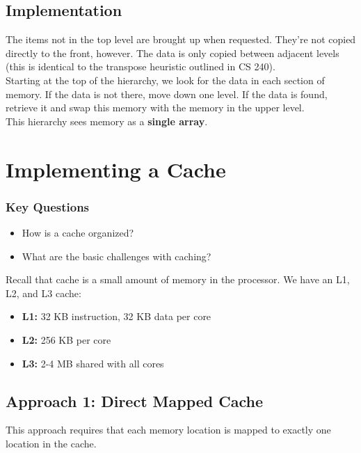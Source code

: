\documentclass{report}
\begin{document}
\subsection{Implementation}
The items not in the top level are brought up when requested. They're not copied directly to the front, however. The data is only copied between adjacent levels (this is identical to the transpose heuristic outlined in CS 240).\\
Starting at the top of the hierarchy, we look for the data in each section of memory. If the data is not there, move down one level. If the data is found, retrieve it and swap this memory with the memory in the upper level.\\
This hierarchy sees memory as a \textbf{single array}.
\section{Implementing a Cache}
\subsubsection{Key Questions}
\begin{itemize}
\item How is a cache organized?
\item What are the basic challenges with caching?
\end{itemize}
Recall that cache is a small amount of memory in the processor. We have an L1, L2, and L3 cache:
\begin{itemize}
\item \textbf{L1:} 32 KB instruction, 32 KB data per core
\item \textbf{L2:} 256 KB per core
\item \textbf{L3:} 2-4 MB shared with all cores
\end{itemize}
\subsection{Approach 1: Direct Mapped Cache}
This approach requires that each memory location is mapped to exactly one location in the cache.
\end{document}
